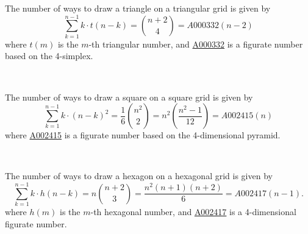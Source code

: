 \documentclass{article}
\begin{document}
The number of ways to draw a triangle on a triangular grid is given by \[
  \sum_{k=1}^{n-1} k\cdot t(n-k)
  = \binom{n+2}{4}
  = A000332(n-2)
\] where $t(m)$ is the $m$-th triangular number, and
\href{https://oeis.org/A000332}{A000332} is a figurate number based on the 4-simplex.

~

\noindent
The number of ways to draw a square on a square grid is given by \[
  \sum_{k=1}^{n-1} k\cdot (n-k)^2
  = \frac 16 \binom{n^2}{2}
  = n^2\left(\frac{n^2 - 1}{12}\right)
  = A002415(n)
\] where \href{https://oeis.org/A002415}{A002415} is a figurate number based on the 4-dimensional pyramid.

~

\noindent
The number of ways to draw a hexagon on a hexagonal grid is given by \[
  \sum_{k=1}^{n-1} k\cdot h(n-k)
  = n\binom {n+2}3
  = \frac{n^2(n+1)(n+2)}{6}
  = A002417(n-1).
\] where $h(m)$ is the $m$-th hexagonal number, and \href{https://oeis.org/A002417}{A002417} is a 4-dimensional figurate number.
\end{document}
